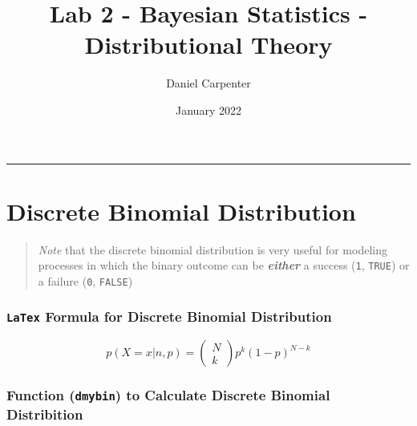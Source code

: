 \documentclass[
  12pt,
]{article}
\title{Lab 2 - Bayesian Statistics - Distributional Theory}
\author{Daniel Carpenter}
\date{January 2022}
\begin{document}
\maketitle

{
\setcounter{tocdepth}{2}
\tableofcontents
}
\begin{center}\rule{0.5\linewidth}{0.5pt}\end{center}

\hypertarget{discrete-binomial-distribution}{%
\section{Discrete Binomial
Distribution}\label{discrete-binomial-distribution}}

\begin{quote}
\emph{Note} that the discrete binomial distribution is very useful for
modeling processes in which the binary outcome can be
\textbf{\emph{either}} a success (\texttt{1}, \texttt{TRUE}) or a
failure (\texttt{0}, \texttt{FALSE})
\end{quote}

\hypertarget{latex-formula-for-discrete-binomial-distribution}{%
\subsubsection{\texorpdfstring{\texttt{LaTex} Formula for Discrete
Binomial
Distribution}{LaTex Formula for Discrete Binomial Distribution}}\label{latex-formula-for-discrete-binomial-distribution}}

\[
p(X = x|n, p) = 
  \begin{pmatrix}
  N \\
  k 
  \end{pmatrix}
p^k(1-p)^{N - k}
\]

\hypertarget{function-dmybin-to-calculate-discrete-binomial-distribition}{%
\subsubsection{\texorpdfstring{Function (\texttt{dmybin}) to Calculate
Discrete Binomial
Distribition}{Function (dmybin) to Calculate Discrete Binomial Distribition}}\label{function-dmybin-to-calculate-discrete-binomial-distribition}}
\end{document}
